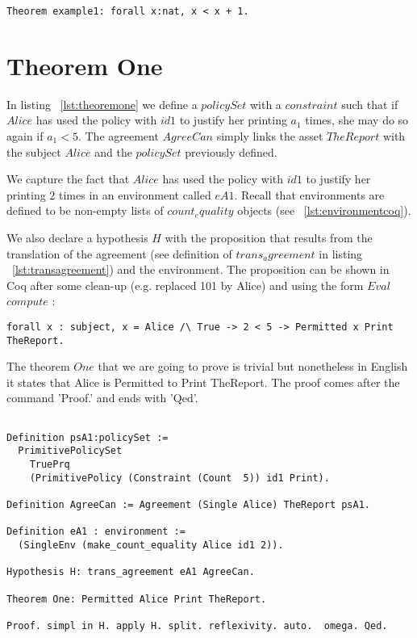 \lstset{language=Coq}
\begin{lstlisting}[frame=single, caption={Proof Example},label={lst:proofexample}]
Theorem example1: forall x:nat, x < x + 1.
\end{lstlisting}

\section{Theorem One}

In listing ~\ref{lst:theoremone} we define a $policySet$ with a $constraint$ such that if $Alice$ has used the policy with $id1$ to justify her printing $a_{1}$ times, she may do so again if $a_{1} < 5$. The agreement $AgreeCan$ simply links the asset $TheReport$ with the subject $Alice$ and the $policySet$ previously defined. 

We capture the fact that $Alice$ has used the policy with $id1$ to justify her printing $2$ times in an environment called $eA1$. Recall that environments are defined to be non-empty lists of $count_equality$ objects (see ~\ref{lst:environmentcoq}). 

We also declare a hypothesis $H$ with the proposition that results from the translation of the agreement (see definition of $trans_agreement$ in listing ~\ref{lst:transagreement}) and the environment. The proposition can be shown in Coq after some clean-up (e.g. replaced 101 by Alice) and using the form $Eval$ $compute$ : 

\lstset{language=Coq}
\begin{lstlisting}[frame=single, caption={Hypothesis for Theorem One},label={lst:theoremonehypo}]
forall x : subject, x = Alice /\ True -> 2 < 5 -> Permitted x Print TheReport.
\end{lstlisting}

The theorem $One$ that we are going to prove is trivial but nonetheless in English it states that Alice is Permitted to Print TheReport. The proof comes after the command 'Proof.' and ends with 'Qed'. 

\lstset{language=Coq}
\begin{lstlisting}[frame=single, caption={Theorem One},label={lst:theoremone}]

Definition psA1:policySet :=
  PrimitivePolicySet
    TruePrq
    (PrimitivePolicy (Constraint (Count  5)) id1 Print).

Definition AgreeCan := Agreement (Single Alice) TheReport psA1.

Definition eA1 : environment := 
  (SingleEnv (make_count_equality Alice id1 2)).

Hypothesis H: trans_agreement eA1 AgreeCan.

Theorem One: Permitted Alice Print TheReport.

Proof. simpl in H. apply H. split. reflexivity. auto.  omega. Qed.


\end{lstlisting}

